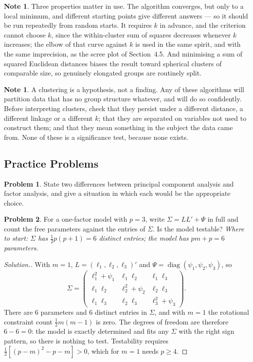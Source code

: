 \documentclass[11pt,a4paper]{article}
\theoremstyle{definition}
\newtheorem{note}[thm]{Note}
\newtheorem{problemx}{Problem}[section]
\newenvironment{problem}{\begin{problemx}}{\end{problemx}}
\newenvironment{solution}
  {\renewcommand{\qedsymbol}{}\begin{proof}[\textit{Solution}.]}
  {\end{proof}}
\begin{document}
\begin{note}
Three properties matter in use. The algorithm converges, but only to a local
minimum, and different starting points give different answers --- so it should
be run repeatedly from random starts. It requires $k$ in advance, and the
criterion cannot choose $k$, since the within-cluster sum of squares decreases
whenever $k$ increases; the elbow of that curve against $k$ is used in the same
spirit, and with the same imprecision, as the scree plot of Section~4.5. And
minimising a sum of squared Euclidean distances biases the result toward
spherical clusters of comparable size, so genuinely elongated groups are
routinely split.
\end{note}

\begin{note}
A clustering is a hypothesis, not a finding. Any of these algorithms will
partition data that has no group structure whatever, and will do so
confidently. Before interpreting clusters, check that they persist under a
different distance, a different linkage or a different $k$; that they are
separated on variables not used to construct them; and that they mean something
in the subject the data came from. None of these is a significance test,
because none exists.
\end{note}

\subsection{Practice Problems}

\begin{problem}
State two differences between principal component analysis and factor analysis,
and give a situation in which each would be the appropriate choice.
\end{problem}

\begin{problem}
For a one-factor model with $p=3$, write $\Sigma=LL'+\Psi$ in full and count the
free parameters against the entries of $\Sigma$. Is the model testable?
\emph{Where to start: $\Sigma$ has $\tfrac12 p(p+1)=6$ distinct entries; the
model has $pm+p=6$ parameters.}
\end{problem}

\begin{solution}
With $m=1$, $L=(\ell_1,\ell_2,\ell_3)'$ and $\Psi=\operatorname{diag}(\psi_1,\psi_2,\psi_3)$, so
$$\Sigma = \begin{pmatrix}
\ell_1^{2}+\psi_1 & \ell_1\ell_2 & \ell_1\ell_3\\
\ell_1\ell_2 & \ell_2^{2}+\psi_2 & \ell_2\ell_3\\
\ell_1\ell_3 & \ell_2\ell_3 & \ell_3^{2}+\psi_3
\end{pmatrix}.$$
There are $6$ parameters and $6$ distinct entries in $\Sigma$, and with $m=1$
the rotational constraint count $\tfrac12 m(m-1)$ is zero. The degrees of
freedom are therefore $6-6=0$: the model is exactly determined and fits any
$\Sigma$ with the right sign pattern, so there is nothing to test. Testability
requires $\tfrac12\left[(p-m)^{2}-p-m\right]>0$, which for $m=1$ needs $p\geq4$.
\end{solution}
\end{document}
